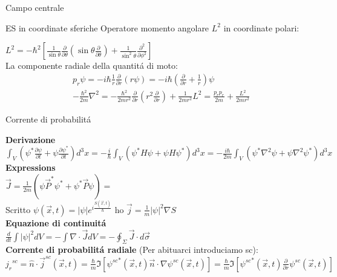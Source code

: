 \begin{frame}{Campo centrale}
    \begin{block}{ES in coordinate sferiche}
Operatore momento angolare $L^2$ in coordinate polari:

$L^2=-\hbar^2[\frac{1}{\sin{\theta}}\frac{\partial}{\partial \theta}(\sin{\theta}\frac{\partial}{\partial \theta})+\frac{1}{\sin^2{\theta}}\frac{\partial^2}{\partial \phi^2}]$\\
La componente radiale della quantit\'a di moto:
\begin{align*}
&p_r\psi=-i\hbar\frac{1}{r}\frac{\partial}{\partial r}(r\psi)=-i\hbar(\frac{\partial}{\partial r}+\frac{1}{r})\psi\\
&-\frac{\hbar^2}{2m}\nabla^2=-\frac{\hbar^2}{2mr^2}\frac{\partial}{\partial r}(r^2\frac{\partial}{\partial r})+\frac{1}{2mr^2}L^2=\frac{p_r{p_r}^{}}{2m}+\frac{L^2}{2mr^2}
\end{align*}
\end{block}
\end{frame}

\begin{frame}{Corrente di probabilit\'a}

\textbf{Derivazione}\\
$\int_V(\psi^*\frac{\partial \psi}{\partial t}+\psi\frac{\partial \psi^*}{\partial t})d^3x=-\frac{i}{\hbar}\int_V(\psi^*H \psi+\psi H\psi^*)d^3x=-\frac{i\hbar}{2m}\int_V(\psi^*\nabla^2\psi+\psi\nabla^2\psi^*)d^3x$
\textbf{Expressions}\\
$\vec{J}=\frac{1}{2m}(\psi\vec{P}^*\psi^*+\psi^*\vec{P}\psi)=$\\
Scritto $\psi(\vec{x},t)=|\psi|e^{i\frac{S(\vec{x},t)}{\hbar}}$ ho $\vec{j}=\frac{1}{m}|\psi|^2\nabla S$\\
\textbf{Equazione di continuit\'a}\\
$\frac{d}{dt}\int |\psi|^2dV=-\int \nabla\cdot{\vec{J}} dV=-\oint_\Sigma \vec{J}\cdot d\vec{\sigma}$\\
\textbf{Corrente di probabilit\'a radiale } (Per abituarci introduciamo sc):\\
${j_r}^{sc}=\hat{n}\cdot\vec{j}^{sc}(\vec{x},t)=\frac{\hbar}{m}\Im [{\psi^{sc}}^*(\vec{x},t)\vec{n}\cdot\nabla\psi^{sc}(\vec{x},t)]=\frac{\hbar}{m}\Im [{\psi^{sc}}^*(\vec{x},t)\frac{\partial}{\partial r}\psi^{sc}(\vec{x},t)]$
\end{frame}

